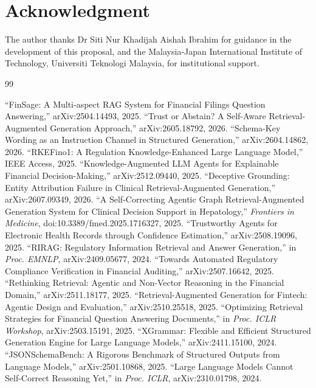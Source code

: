 \documentclass[10pt,twocolumn,letterpaper]{article}
\begin{document}
\section*{Acknowledgment}

The author thanks Dr Siti Nur Khadijah Aishah Ibrahim for guidance in the development of this proposal, and the Malaysia-Japan International Institute of Technology, Universiti Teknologi Malaysia, for institutional support.

\begin{thebibliography}{99}
\footnotesize

 ``FinSage: A Multi-aspect RAG System for Financial Filings Question Answering,'' arXiv:2504.14493, 2025.
 ``Trust or Abstain? A Self-Aware Retrieval-Augmented Generation Approach,'' arXiv:2605.18792, 2026.
 ``Schema-Key Wording as an Instruction Channel in Structured Generation,'' arXiv:2604.14862, 2026.
 ``RKEFino1: A Regulation Knowledge-Enhanced Large Language Model,'' IEEE Access, 2025.
 ``Knowledge-Augmented LLM Agents for Explainable Financial Decision-Making,'' arXiv:2512.09440, 2025.
 ``Deceptive Grounding: Entity Attribution Failure in Clinical Retrieval-Augmented Generation,'' arXiv:2607.09349, 2026.
 ``A Self-Correcting Agentic Graph Retrieval-Augmented Generation System for Clinical Decision Support in Hepatology,'' \emph{Frontiers in Medicine}, doi:10.3389/fmed.2025.1716327, 2025.
 ``Trustworthy Agents for Electronic Health Records through Confidence Estimation,'' arXiv:2508.19096, 2025.
 ``RIRAG: Regulatory Information Retrieval and Answer Generation,'' in \emph{Proc. EMNLP}, arXiv:2409.05677, 2024.
 ``Towards Automated Regulatory Compliance Verification in Financial Auditing,'' arXiv:2507.16642, 2025.
 ``Rethinking Retrieval: Agentic and Non-Vector Reasoning in the Financial Domain,'' arXiv:2511.18177, 2025.
 ``Retrieval-Augmented Generation for Fintech: Agentic Design and Evaluation,'' arXiv:2510.25518, 2025.
 ``Optimizing Retrieval Strategies for Financial Question Answering Documents,'' in \emph{Proc. ICLR Workshop}, arXiv:2503.15191, 2025.
 ``XGrammar: Flexible and Efficient Structured Generation Engine for Large Language Models,'' arXiv:2411.15100, 2024.
 ``JSONSchemaBench: A Rigorous Benchmark of Structured Outputs from Language Models,'' arXiv:2501.10868, 2025.
 ``Large Language Models Cannot Self-Correct Reasoning Yet,'' in \emph{Proc. ICLR}, arXiv:2310.01798, 2024.

\end{thebibliography}
\end{document}
